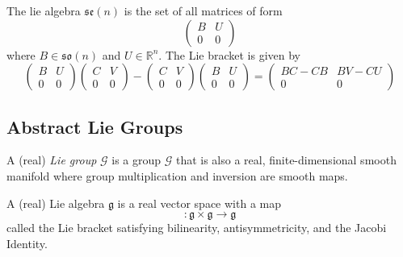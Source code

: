 \documentclass{article}
\begin{document}
      \begin{example}
        The lie algebra $\mathfrak{se}(n)$ is the set of all matrices of form 
        \begin{equation}
          \begin{pmatrix}
          B & U \\ 0 & 0
          \end{pmatrix}
        \end{equation}
        where $B \in \mathfrak{so}(n)$ and $U \in \mathbb{R}^n$. The Lie bracket is given by
        \begin{equation}
          \begin{pmatrix}
          B & U \\ 0 & 0
          \end{pmatrix} \begin{pmatrix}
          C & V \\ 0 & 0
          \end{pmatrix} - \begin{pmatrix}
          C & V \\ 0 & 0
          \end{pmatrix} \begin{pmatrix}
          B & U \\ 0 & 0
          \end{pmatrix} = \begin{pmatrix}
          BC - CB & BV - CU \\ 0 & 0
          \end{pmatrix}
        \end{equation}
      \end{example}

  \subsection{Abstract Lie Groups}

    \begin{definition}
      A (real) \textit{Lie group} $\mathcal{G}$ is a group $\mathcal{G}$ that is also a real, finite-dimensional smooth manifold where  group multiplication and inversion are smooth maps. 
    \end{definition}

    \begin{definition}
      A (real) Lie algebra $\mathfrak{g}$ is a real vector space with a map 
      \begin{equation}
        [\cdot, \cdot]: \mathfrak{g} \times \mathfrak{g} \longrightarrow \mathfrak{g}
      \end{equation}
      called the Lie bracket satisfying bilinearity, antisymmetricity, and the Jacobi Identity. 
    \end{definition}
\end{document}
